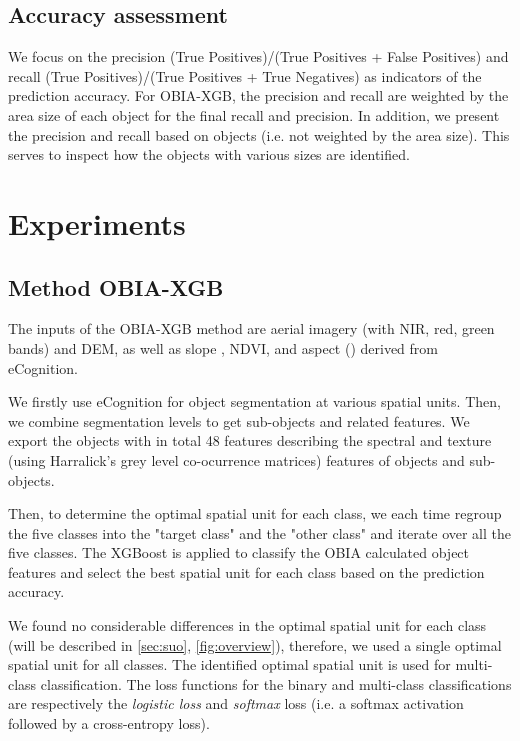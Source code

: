 \documentclass{isprs} %
\begin{document}
\subsection{Accuracy assessment}

We focus on the precision (True Positives)/(True Positives + False Positives) and recall (True Positives)/(True Positives + True Negatives) as indicators of the prediction accuracy.  
For OBIA-XGB, the precision and recall are weighted by the area size of each object for the final recall and precision. In addition, we present the precision and recall based on objects (i.e. not weighted by the area size). This serves to inspect how the objects with various sizes are identified.  

\section{Experiments}

\subsection{Method OBIA-XGB}

The inputs of the OBIA-XGB method are aerial imagery (with NIR, red, green bands) and DEM, as well as slope \citep{zevenbergen1987quantitative}, NDVI, and aspect (\citep{horn1981hill}) derived from eCognition. 

We firstly use eCognition for object segmentation at various spatial units. Then, we combine segmentation levels to get sub-objects and related features. 
We export the objects with in total 48 features describing the spectral and texture (using Harralick's grey level co-ocurrence matrices) features of objects and sub-objects.

Then, to determine the optimal spatial unit for each class, we each time regroup the five classes into the "target class" and the "other class" and iterate over all the five classes. The XGBoost is applied to classify the OBIA calculated object features and select the best spatial unit for each class based on the prediction accuracy. 

We found no considerable differences in the optimal spatial unit for each class (will be described in \cref{sec:suo}, \cref{fig:overview}), therefore, we used a single optimal spatial unit for all classes. The identified optimal spatial unit is used for multi-class classification. The loss functions for the binary and multi-class classifications are respectively the \textit{logistic loss} and \textit{softmax} loss (i.e. a softmax activation followed by a cross-entropy loss). 
\end{document}
